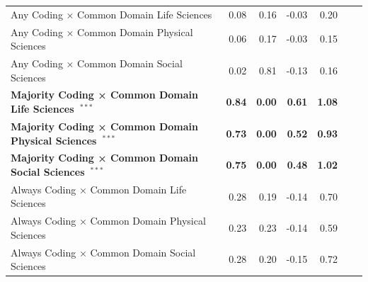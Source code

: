 \documentclass[
  letterpaper,
  DIV=11,
  numbers=noendperiod]{scrartcl}
\begin{document}
\begin{table}
{{\begin{tabular}{l*{6}{r}}
    \cellcolor{white}Any Coding × Common Domain Life Sciences & \cellcolor{white}0.08 & \cellcolor{white}0.16 & \cellcolor{white}-0.03 & \cellcolor{white}0.20 \\
    \cellcolor{gray!10}Any Coding × Common Domain Physical Sciences & \cellcolor{gray!10}0.06 & \cellcolor{gray!10}0.17 & \cellcolor{gray!10}-0.03 & \cellcolor{gray!10}0.15 \\
    \cellcolor{white}Any Coding × Common Domain Social Sciences & \cellcolor{white}0.02 & \cellcolor{white}0.81 & \cellcolor{white}-0.13 & \cellcolor{white}0.16 \\
    \bfseries\cellcolor{gray!10}Majority Coding × Common Domain Life Sciences~$^{***}$ & \bfseries\cellcolor{gray!10}0.84 & \bfseries\cellcolor{gray!10}0.00 & \bfseries\cellcolor{gray!10}0.61 & \bfseries\cellcolor{gray!10}1.08 \\
    \bfseries\cellcolor{white}Majority Coding × Common Domain Physical Sciences~$^{***}$ & \bfseries\cellcolor{white}0.73 & \bfseries\cellcolor{white}0.00 & \bfseries\cellcolor{white}0.52 & \bfseries\cellcolor{white}0.93 \\
    \bfseries\cellcolor{gray!10}Majority Coding × Common Domain Social Sciences~$^{***}$ & \bfseries\cellcolor{gray!10}0.75 & \bfseries\cellcolor{gray!10}0.00 & \bfseries\cellcolor{gray!10}0.48 & \bfseries\cellcolor{gray!10}1.02 \\
    \cellcolor{white}Always Coding × Common Domain Life Sciences & \cellcolor{white}0.28 & \cellcolor{white}0.19 & \cellcolor{white}-0.14 & \cellcolor{white}0.70 \\
    \cellcolor{gray!10}Always Coding × Common Domain Physical Sciences & \cellcolor{gray!10}0.23 & \cellcolor{gray!10}0.23 & \cellcolor{gray!10}-0.14 & \cellcolor{gray!10}0.59 \\
    \cellcolor{white}Always Coding × Common Domain Social Sciences & \cellcolor{white}0.28 & \cellcolor{white}0.20 & \cellcolor{white}-0.15 & \cellcolor{white}0.72 \\
\bottomrule
\end{tabular}
}

}

\end{table}%
\end{document}
